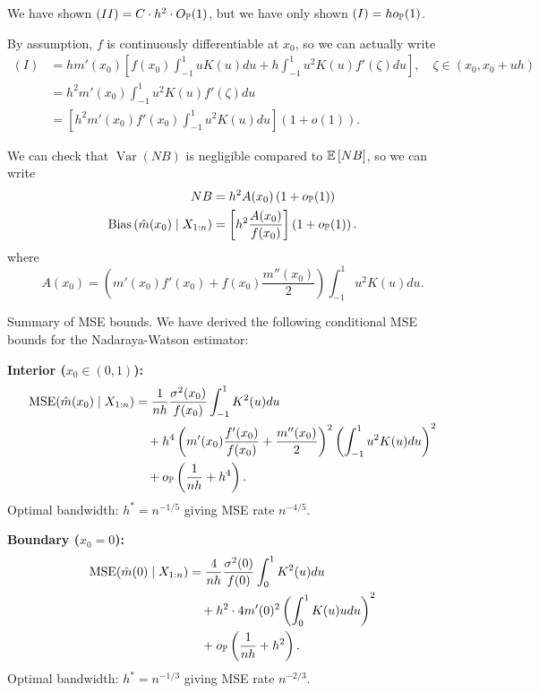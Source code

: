 We have shown $(II) = C \cdot h^2 \cdot O_\P(1)$, but we have only shown $(I) = h o_\P(1)$.

By assumption, $f$ is continuously differentiable at $x_0$, so we can actually write
\begin{align*}
	(I) &= hm'(x_0) \left[ f(x_0) \int_{-1}^{1} uK(u)du + h \int_{-1}^{1} u^2 K(u) f'(\zeta) du   \right], \quad \zeta \in (x_0,x_0+uh) \\
		&= h^2m'(x_0) \int_{-1}^{1} u^2K(u) f'(\zeta)du \\
		&= \left[h^2 m'(x_0) f'(x_0) \int_{-1}^{1} u^2 K(u)du \right]\left( 1+o(1) \right) 
.\end{align*}

We can check that $\operatorname{Var}\left(NB\right)$ is negligible compared to $\E\left[NB\right]$, so we can write
\begin{align*}
		NB &= h^2 A(x_0)\left( 1 + o_\P(1) \right) \\
		\operatorname{Bias}\left(\hat{m}(x_0) \mid X_{1:n}\right)
		&= \left[ h^2 \frac{A(x_0)}{f(x_0)} \right] \left( 1+o_\P(1) \right)
	.\end{align*} 
	where
	\[
		A(x_0) = \left( m'(x_0)f'(x_0) + f(x_0) \frac{m''(x_0)}{2} \right) \int_{-1}^{1} u^2 K(u)du.
	\]

Summary of MSE bounds.
We have derived the following conditional MSE bounds for the Nadaraya-Watson estimator:

\textbf{Interior ($x_0 \in (0,1)$):}
\begin{align*}
	\MSE(\hat{m}(x_0) \mid X_{1:n})
	&= \frac{1}{nh} \frac{\sigma^2(x_0)}{f(x_0)} \int_{-1}^{1} K^2(u)du \\
	&\quad + h^4 \left( m'(x_0) \frac{f'(x_0)}{f(x_0)} + \frac{m''(x_0)}{2}  \right)^2 \left( \int_{-1}^{1} u^2 K(u)du \right)^2 \\
	&\quad + o_\P\left( \frac{1}{nh} + h^4 \right)
.\end{align*}
Optimal bandwidth: $h^* = n^{-1/5}$ giving MSE rate $n^{-4/5}$.

\textbf{Boundary ($x_0 = 0$):}
\begin{align*}
	\MSE(\hat{m}(0) \mid X_{1:n})
	&= \frac{4}{nh} \frac{\sigma^2(0)}{f(0)} \int_{0}^{1} K^2(u)du \\
	&\quad + h^2 \cdot 4 m'(0)^2 \left( \int_{0}^{1} K(u)udu  \right)^2 \\
	&\quad + o_\P\left( \frac{1}{nh} + h^2 \right)
.\end{align*}
Optimal bandwidth: $h^* = n^{-1/3}$ giving MSE rate $n^{-2/3}$.

